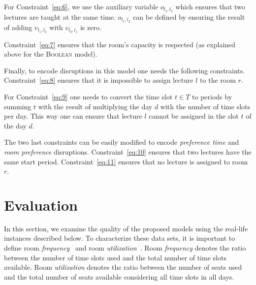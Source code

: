 \documentclass[twocolumn,natbib]{svjour3}          %
\newcounter{constraint}
\begin{document}
For Constraint~\ref{eq:6}, we use the auxiliary variable $o_{l_1,l_2}$ which ensures that two lectures are taught at the same time.  $o_{l_1,l_2}$  can be defined by ensuring the result of adding $v_{l_1,l_2}$ with $v_{l_2,l_1}$ is zero. 

Constraint~\ref{eq:7} ensures that the room's capacity is respected (as explained above for the \textsc{Boolean} model). 


Finally, to encode disruptions in this model one needs the following constraints. Constraint~\ref{eq:8} ensures that it is impossible to assign lecture $l$ to the room $r$.

For Constraint~\ref{eq:9} one needs to convert the time slot $t \in T$ to periods by summing $t$ with the result of multiplying the day $d$ with the number of time slots per day. This way one can ensure that lecture $l$ cannot be assigned in the slot $t$ of the day $d$.

The two last constraints can be easily modified to encode {\it preference time} and {\it room preference} disruptions. Constraint~\ref{eq:10} ensures that two lectures have the same start period. Constraint~\ref{eq:11} ensures that no lecture is assigned to room~$r$. 



\section{Evaluation}\label{sec:eval}


In this section, we examine the quality of the proposed models using the real-life instances described below. To characterize these data sets, it is important to define room \textit{frequency}~\citep{beyrouthy2009towards} and room \textit{utilization}~\citep{beyrouthy2009towards}. Room \textit{frequency} denotes the ratio between the number of time slots used and the total number of time slots available. Room \textit{utilization} denotes the ratio between the number of seats used and the total number of seats available considering all time slots in all days.
\end{document}

